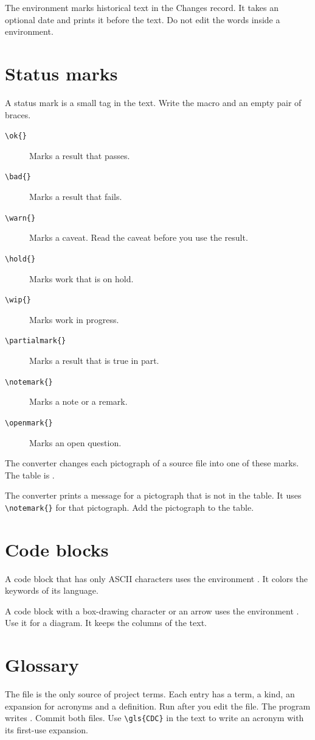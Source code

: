 The environment  marks historical text in the Changes record. It takes an optional date and prints it before the text. Do not edit the words inside a  environment.

\section{Status marks}
A status mark is a small tag in the text. Write the macro and an empty pair of braces.
\begin{description}
  \item[\texttt{\textbackslash ok\{\}}] Marks a result that passes.
  \item[\texttt{\textbackslash bad\{\}}] Marks a result that fails.
  \item[\texttt{\textbackslash warn\{\}}] Marks a caveat. Read the caveat before you use the result.
  \item[\texttt{\textbackslash hold\{\}}] Marks work that is on hold.
  \item[\texttt{\textbackslash wip\{\}}] Marks work in progress.
  \item[\texttt{\textbackslash partialmark\{\}}] Marks a result that is true in part.
  \item[\texttt{\textbackslash notemark\{\}}] Marks a note or a remark.
  \item[\texttt{\textbackslash openmark\{\}}] Marks an open question.
\end{description}
The converter changes each pictograph of a source file into one of these marks. The table is .

The converter prints a message for a pictograph that is not in the table. It uses \texttt{\textbackslash notemark\{\}} for that pictograph. Add the pictograph to the table.

\section{Code blocks}
A code block that has only ASCII characters uses the environment . It colors the keywords of its language.

A code block with a box-drawing character or an arrow uses the environment . Use it for a diagram. It keeps the columns of the text.

\section{Glossary}
The file  is the only source of project terms. Each entry has a term, a kind, an expansion for acronyms and a definition. Run  after you edit the file. The program writes . Commit both files. Use \texttt{\textbackslash gls\{CDC\}} in the text to write an acronym with its first-use expansion.

